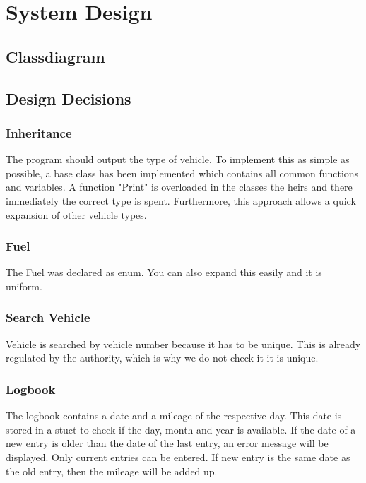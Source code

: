 \section{System Design}
\subsection{Classdiagram}

\subsection{Design Decisions}
\subsubsection{Inheritance}
The program should output the type of vehicle. To implement this as simple as possible, a base class has been implemented which contains all common functions and variables. A function "Print" is overloaded in the classes the heirs and there immediately the correct type is spent.
Furthermore, this approach allows a quick expansion of other vehicle types.

\subsubsection{Fuel}
The Fuel was declared as enum. You can also expand this easily and it is uniform.

\subsubsection{Search Vehicle}
Vehicle is searched by vehicle number because it has to be unique. This is already regulated by the authority, which is why we do not check it it is unique.

\subsubsection{Logbook}
The logbook contains a date and a mileage of the respective day. This date is stored in a stuct to check if the day, month and year is available.
If the date of a new entry is older than the date of the last entry, an error message will be displayed. Only current entries can be entered. If new entry is the same date as the old entry, then the mileage will be added up.

